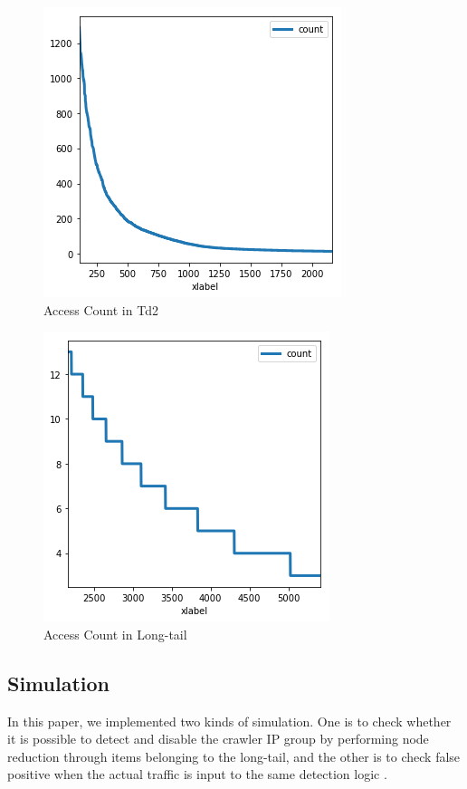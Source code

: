 \documentclass[letterpaper, 10 pt, conference]{ieeeconf}
\begin{document}
\begin{figure}[H]
    \centering
    \includegraphics[width=0.7\columnwidth]{figs/figure_03_td2.png}
    \caption{Access Count in Td2}
    \label{fig:my_label}
\end{figure}

\begin{figure}[H]
    \centering
    \includegraphics[width=0.7\columnwidth]{figs/figure_04_td3.png}
    \caption{Access Count in Long-tail}
    \label{fig:my_label}
\end{figure}

\subsection{Simulation}
In this paper, we implemented two kinds of simulation. One is to check whether it is possible to detect and disable the crawler IP group by performing node reduction through items belonging to the long-tail, and the other is to check false positive when the actual traffic is input to the same detection logic .
\end{document}
